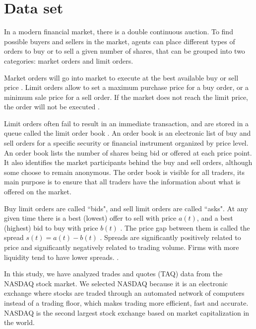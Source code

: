\section{Data set}\label{sec:data}

In a modern financial market, there is a double continuous auction. To find
possible buyers and sellers in the market, agents can place different types of
orders to buy or to sell a given number of shares, that can be grouped into
two categories: market orders and limit orders.

Market orders will go into market to execute at the best available buy or sell
price \cite{large_prices_changes,predictive_pow,stat_theory}. Limit orders
allow to set a maximum purchase price for a buy order, or a minimum sale price
for a sell order. If the market does not reach the limit price, the order will
not be executed \cite{large_prices_changes,predictive_pow,stat_theory}.

Limit orders often fail to result in an immediate transaction, and are stored
in a queue called the limit order book
\cite{stat_prop,predictive_pow,prop_order_book}. An order book is an electronic
list of buy and sell orders for a specific security or financial instrument
organized by price level. An order book lists the number of shares being bid or
offered at each price point. It also identifies the market participants behind
the buy and sell orders, although some choose to remain anonymous. The order
book is visible for all traders, its main purpose is to ensure that all traders
have the information about what is offered on the market.

Buy limit orders are called ``bids", and sell limit orders are called ``asks".
At any given time there is a best (lowest) offer to sell with price
$a\left(t\right)$, and a best (highest) bid to buy with price $b\left(t\right)$
\cite{subtle_nature,account_spread,limit_ord_spread,prop_order_book,stat_theory}.
The price gap between them is called the spread
$s\left(t\right) = a\left(t\right)-b\left(t\right)$
\cite{subtle_nature,market_digest,Bouchaud_2004,account_spread,large_prices_changes,stat_theory}.
Spreads are significantly positively related to price and significantly
negatively related to trading volume. Firms with more liquidity tend to have
lower spreads.
\cite{components_spread_tokyo,effects_spread,account_spread,components_spread}.

In this study, we have analyzed trades and quotes (TAQ) data from the NASDAQ
stock market. We selected NASDAQ because it is an electronic exchange where
stocks are traded through an automated network of computers instead of a
trading floor, which makes trading more efficient, fast and accurate. NASDAQ is
the second largest stock exchange based on market capitalization in the world.

